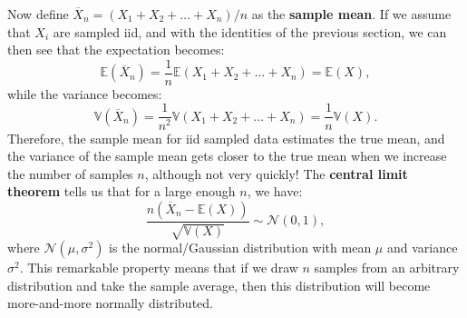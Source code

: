 \documentclass{article}
\begin{document}
Now define $\overline{X}_n=(X_1+X_2+\dots+X_n)/n$ as the \textbf{sample mean}. If we assume that $X_i$ are sampled iid, and with the identities of the previous section, we can then see that the expectation becomes:
\begin{equation}
    \mathbb{E}(\overline{X}_n) = \frac{1}{n}\mathbb{E}(X_1+X_2+\dots+X_n)=\mathbb{E}(X),
\end{equation}
while the variance becomes:
\begin{equation}
    \mathbb{V}(\overline{X}_n) = \frac{1}{n^2}\mathbb{V}(X_1+X_2+\dots+X_n) = \frac{1}{n}\mathbb{V}(X).
\end{equation}
Therefore, the sample mean for iid sampled data estimates the true mean, and the variance of the sample mean gets closer to the true mean when we increase the number of samples $n$, although not very quickly! The \textbf{central limit theorem} tells us that for a large enough $n$, we have:
\begin{equation}
    \frac{n(\overline{X}_n-\mathbb{E}(X))}{\sqrt{\mathbb{V}(X)}} \sim \mathcal{N}(0,1),
\end{equation}
where $\mathcal{N}(\mu,\sigma^2)$ is the normal/Gaussian distribution with mean $\mu$ and variance $\sigma^2$. This remarkable property means that if we draw $n$ samples from an arbitrary distribution and take the sample average, then this distribution will become more-and-more normally distributed.
\end{document}
